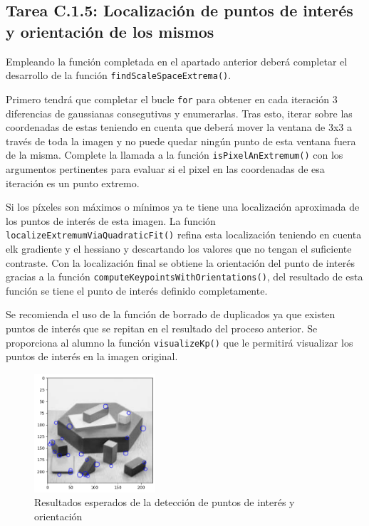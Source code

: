 \subsection*{Tarea C.1.5: Localización de puntos de interés y orientación de los mismos}

Empleando la función completada en el apartado anterior deberá completar el desarrollo de la función \texttt{findScaleSpaceExtrema()}.

Primero tendrá que completar el bucle \texttt{for} para obtener en cada iteración 3 diferencias de gaussianas consegutivas y enumerarlas. Tras esto, iterar sobre las coordenadas de estas teniendo en cuenta que deberá mover la ventana de 3x3 a través de toda la imagen y no puede quedar ningún punto de esta ventana fuera de la misma. Complete la llamada a la función \texttt{isPixelAnExtremum()} con los argumentos pertinentes para evaluar si el pixel en las coordenadas de esa iteración es un punto extremo.

Si los píxeles son máximos o mínimos ya te tiene una localización aproximada de los puntos de interés de esta imagen. La función \texttt{localizeExtremumViaQuadraticFit()} refina esta localización teniendo en cuenta elk gradiente y el hessiano y descartando los valores que no tengan el suficiente contraste. Con la localización final se obtiene la orientación del punto de interés gracias a la función \texttt{computeKeypointsWithOrientations()}, del resultado de esta función se tiene el punto de interés definido completamente.

Se recomienda el uso de la función de borrado de duplicados ya que existen puntos de interés que se repitan en el resultado del proceso anterior. Se proporciona al alumno la función \texttt{visualizeKp()} que le permitirá visualizar los puntos de interés en la imagen original.

\begin{figure}[h]
    \centering
    \includegraphics[width=0.4\textwidth]{Lab_3/template/figures/KeypointDetect.png}
    \caption{Resultados esperados de la detección de puntos de interés y orientación}
    \label{fig:KPDet}
\end{figure}

